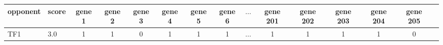 \begin{tabular}{llccccccccccccc}
\toprule
opponent &  score &  gene 1 &  gene 2 &  gene 3 &  gene 4 &  gene 5 &  gene 6 &  \(\dots\) & gene 201 &  gene 202 &  gene 203 &  gene 204 &  gene 205 \\
\midrule
TF1 &    3.0 &       1 &       1 &       0 &       1 &       1 &       1 & \(\dots\) &  1 &         1 &         1 &         1 &         0 \\
\bottomrule
\end{tabular}
